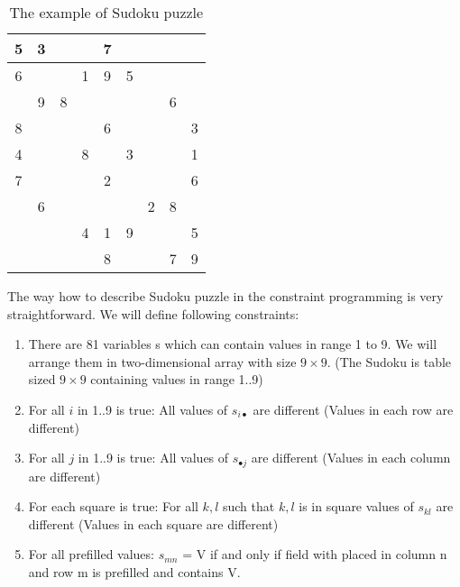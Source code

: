 \begin{table}[ht]
\caption{\label{sudoku-example}The example of Sudoku puzzle}
\begin{center}
\begin{tabular}{||c|c|c||c|c|c||c|c|c||}
\hline\hline 5 & 3 &   &   & 7 &   &   &   &   \\
\hline		 6 &   &   & 1 & 9 & 5 &   &   &   \\
\hline 		   & 9 & 8 &   &   &   &   & 6 &   \\

\hline\hline 8 &   &   &   & 6 &   &   &   & 3 \\
\hline		 4 &   &   & 8 &   & 3 &   &   & 1 \\
\hline		 7 &   &   &   & 2 &   &   &   & 6 \\

\hline\hline   & 6 &   &   &   &   & 2 & 8 &   \\
\hline		   &   &   & 4 & 1 & 9 &   &   & 5 \\
\hline		   &   &   &   & 8 &   &   & 7 & 9 \\
\hline\hline
\end{tabular}
\end{center}
\end{table}

The way how to describe Sudoku puzzle in the constraint programming is very straightforward. We will define following constraints:

\begin{enumerate}
\item	There are 81 variables s which can contain values in range 1 to 9. We will arrange them in two-dimensional array with size $9 \times 9$. (The Sudoku is table sized $9 \times 9$ containing values in range 1..9) \\
\item	For all $i$ in 1..9 is true: All values of $s_{i\bullet}$ are different (Values in each row are different) \\
\item	For all $j$ in 1..9 is true: All values of $s_{\bullet j}$ are different (Values in each column are different) \\
\item\label{sudoku-constraint-square}	For each square is true: For all $k,l$ such that $k,l$ is in square values of $s_{kl}$ are different (Values in each square are different) \\
\item	For all prefilled values: $s_{mn}$ = V if and only if field with placed in column n and row m is prefilled and contains V.
\end{enumerate}

